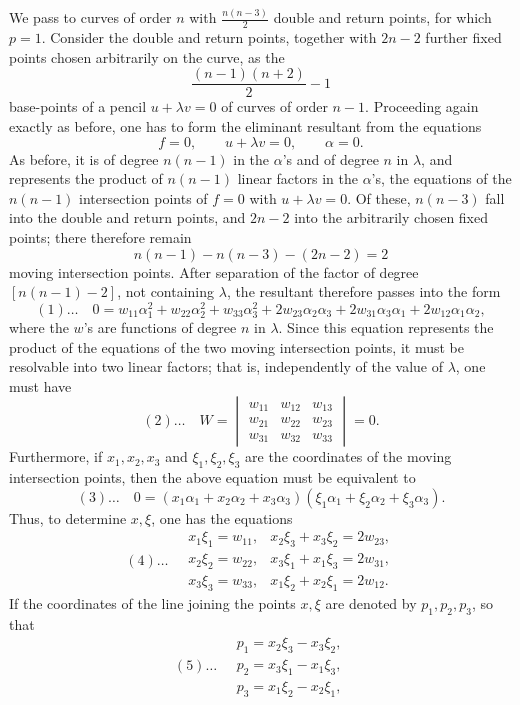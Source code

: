 \documentclass[10pt]{article}
\begin{document}
We pass to curves of order \(n\) with \(\frac{n(n-3)}{2}\) double and return points, for which \(p=1\). Consider the double and return points, together with \(2n-2\) further fixed points chosen arbitrarily on the curve, as the
\[
\frac{(n-1)(n+2)}{2}-1
\]
base-points of a pencil \(u+\lambda v=0\) of curves of order \(n-1\). Proceeding again exactly as before, one has to form the eliminant resultant from the equations
\[
f=0,\qquad u+\lambda v=0,\qquad \alpha=0.
\]
As before, it is of degree \(n(n-1)\) in the \(\alpha\)'s and of degree \(n\) in \(\lambda\), and represents the product of \(n(n-1)\) linear factors in the \(\alpha\)'s, the equations of the \(n(n-1)\) intersection points of \(f=0\) with \(u+\lambda v=0\). Of these, \(n(n-3)\) fall into the double and return points, and \(2n-2\) into the arbitrarily chosen fixed points; there therefore remain
\[
n(n-1)-n(n-3)-(2n-2)=2
\]
moving intersection points. After separation of the factor of degree \([n(n-1)-2]\), not containing \(\lambda\), the resultant therefore passes into the form
\[
(1)\ldots\quad
0=w_{11}\alpha_1^2+w_{22}\alpha_2^2+w_{33}\alpha_3^2
+2w_{23}\alpha_2\alpha_3+2w_{31}\alpha_3\alpha_1+2w_{12}\alpha_1\alpha_2,
\]
where the \(w\)'s are functions of degree \(n\) in \(\lambda\). Since this equation represents the product of the equations of the two moving intersection points, it must be resolvable into two linear factors; that is, independently of the value of \(\lambda\), one must have
\[
(2)\ldots\quad
W=\begin{vmatrix}
w_{11}&w_{12}&w_{13}\\
w_{21}&w_{22}&w_{23}\\
w_{31}&w_{32}&w_{33}
\end{vmatrix}=0.
\]
Furthermore, if \(x_1,x_2,x_3\) and \(\xi_1,\xi_2,\xi_3\) are the coordinates of the moving intersection points, then the above equation must be equivalent to
\[
(3)\ldots\quad
0=(x_1\alpha_1+x_2\alpha_2+x_3\alpha_3)(\xi_1\alpha_1+\xi_2\alpha_2+\xi_3\alpha_3).
\]
Thus, to determine \(x,\xi\), one has the equations
\[
(4)\ldots\quad
\begin{array}{lll}
x_1\xi_1=w_{11},&
x_2\xi_3+x_3\xi_2=2w_{23},\\
x_2\xi_2=w_{22},&
x_3\xi_1+x_1\xi_3=2w_{31},\\
x_3\xi_3=w_{33},&
x_1\xi_2+x_2\xi_1=2w_{12}.
\end{array}
\]
If the coordinates of the line joining the points \(x,\xi\) are denoted by \(p_1,p_2,p_3\), so that
\[
(5)\ldots\quad
\begin{gathered}
p_1=x_2\xi_3-x_3\xi_2,\\
p_2=x_3\xi_1-x_1\xi_3,\\
p_3=x_1\xi_2-x_2\xi_1,
\end{gathered}
\]
\end{document}
